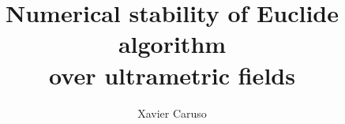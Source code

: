 \documentclass{article}
\DeclareMathOperator{\val}{val}
\begin{document}
\newtheorem{theo}{Theorem}[section]
\newtheorem{lem}[theo]{Lemma}
\newtheorem{prop}[theo]{Proposition}
\newtheorem{cor}[theo]{Corollary}
\newtheorem{quest}[theo]{Question}
\theoremstyle{definition}
\newtheorem{rem}[theo]{Remark}
\newtheorem{ex}[theo]{Example}
\newtheorem{deftn}[theo]{Definition}
\newtheorem{rmk}[theo]{Remark}

\newcommand{\N}{\mathbb N}
\newcommand{\Z}{\mathbb Z}
\newcommand{\Zp}{\Z_p}
\newcommand{\Q}{\mathbb Q}
\newcommand{\Qp}{\Q_p}
\newcommand{\F}{\mathbb F}
\newcommand{\Fp}{\F_p}
\newcommand{\R}{\mathbb R}
\renewcommand{\O}{\mathcal O}
\newcommand{\m}{\mathfrak m}
\newcommand{\calL}{\mathcal L}

\newcommand{\M}{\text{\tt M}}

\renewcommand{\min}{\text{\rm min}}
\renewcommand{\max}{\text{\rm max}}

\newcommand{\ring}{\mathfrak A}
\newcommand{\fracring}{\mathfrak K}
\renewcommand{\prec}{\text{\rm prec}}
\renewcommand{\val}{\text{\rm val}}
\newcommand{\id}{\text{\rm id}}
\renewcommand{\Res}{\text{\rm Res}}
\newcommand{\lc}{\text{\rm lc}}
\newcommand{\Card}{\text{\rm Card}\:}

\renewcommand{\P}{\mathbb P}
\newcommand{\E}{\mathbb E}
\newcommand{\Var}{\text{\rm Var}}
\newcommand{\Cov}{\text{\rm Cov}}


\newcommand{\lb}{\ensuremath{\llbracket}}
\newcommand{\rb}{\ensuremath{\rrbracket}}
\newcommand{\lp}{(\!(}
\newcommand{\rp}{)\!)}
\newcommand{\col}{\: : \:}

\newcommand{\A}{W}

\def\todo#1{\ \!\!{\color{red} #1}}

\def\binom#1#2{\Big(\begin{array}{cc} #1 \\ #2 \end{array}\Big)}

\title{Numerical stability of Euclide algorithm\\over ultrametric fields}

\author{Xavier Caruso}

\maketitle
\end{document}
